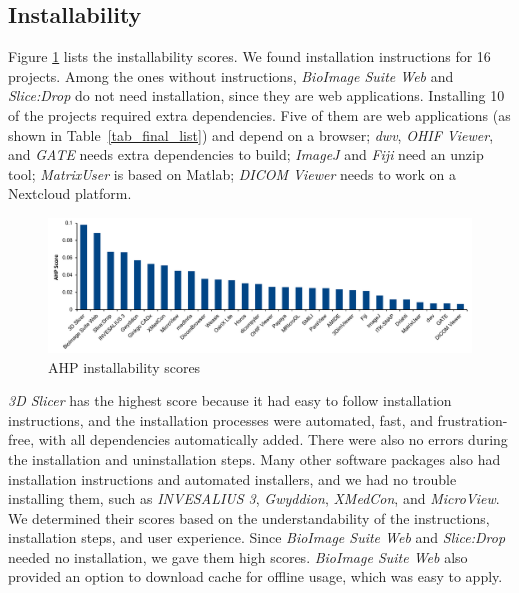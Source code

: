 \documentclass[final, 3p, times, authoryear]{elsarticle}
\begin{document}
\subsection{Installability} \label{sec_result_installability}

Figure \ref{fg_installability_scores} lists the installability scores.  We found
installation instructions for 16 projects. Among the ones without instructions,
\textit{BioImage Suite Web} and \textit{Slice:Drop} do not need installation,
since they are web applications. Installing 10 of the projects required extra
dependencies. Five of them are web applications (as shown in
Table~\ref{tab_final_list}) and depend on a browser; \textit{dwv}, \textit{OHIF
Viewer}, and \textit{GATE} needs extra dependencies to build; \textit{ImageJ}
and	\textit{Fiji} need an unzip tool; \textit{MatrixUser} is based on Matlab;
\textit{DICOM Viewer} needs to work on a Nextcloud platform.

\begin{figure}[!ht]
\includegraphics[scale=0.48]{figures/installability_scores.pdf}
\caption{AHP installability scores}
\label{fg_installability_scores}
\end{figure}

\textit{3D Slicer} has the highest score because it had easy to follow
installation instructions, and the installation processes were automated, fast,
and frustration-free, with all dependencies automatically added. There were also
no errors during the installation and uninstallation steps. Many other software
packages also had installation instructions and automated installers, and we had
no trouble installing them, such as \textit{INVESALIUS 3}, \textit{Gwyddion},
\textit{XMedCon}, and \textit{MicroView}. We determined their scores based on
the understandability of the instructions, installation steps, and user
experience. Since \textit{BioImage Suite Web} and \textit{Slice:Drop} needed no
installation, we gave them high scores. \textit{BioImage Suite Web} also
provided an option to download cache for offline usage, which was easy
to apply.
\end{document}
